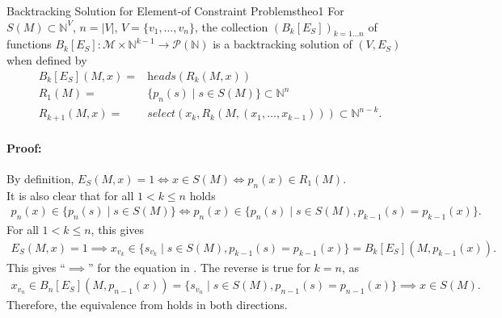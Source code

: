 \begin{theorem}{Backtracking Solution for Element-of Constraint Problems}{theo1}
    For $S(M)\subset\mathbb N^V$, $n=|V|$, $V=\{v_1,\dots,v_n\}$, the collection $(B_k[E_S])_{k=1\dots n}$ of
    functions
    $B_k[E_S]\colon\mathcal M\times\mathbb N^{k-1}\rightarrow\mathcal P(\mathbb N)$
    is a backtracking solution of $(V,E_S)$ when defined by
    \begin{align*}
        B_k[E_S](M,x)={}&\textit{heads}(R_k(M,x))\\
        R_1(M)={}&\{p_n(s)\mid s\in S(M)\}\subset\mathbb N^{n}\\
        R_{k+1}(M,x)={}&\textit{select}(x_k,R_k(M,(x_1,\dots,x_{k-1})))\subset\mathbb N^{n-k}.
    \end{align*}
    \tcblower
    \paragraph*{Proof:} By definition,
    $E_S(M,x)=1\iff x\in S(M)\iff p_n(x)\in R_1(M)$.\\
    It is also clear that for all $1<k\leq n$ holds
    \begin{align*}
        p_n(x)\in\{p_n(s)\mid s\in S(M)\}\iff p_n(x)\in\{p_n(s)\mid s\in S(M),p_{k-1}(s)=p_{k-1}(x)\}.
    \end{align*}
    For all $1<k\leq n$, this gives
    \begin{align*}
        E_S(M,x)=1\implies x_{v_k}\in\{s_{v_k}\mid s\in S(M),p_{k-1}(s)=p_{k-1}(x)\}=B_k[E_S](M,p_{k-1}(x)).
    \end{align*}
    This gives ``$\implies$'' for the equation in .
    The reverse is true for $k=n$, as
    \begin{align*}
        x_{v_n}\in B_n[E_S](M,p_{n-1}(x))=\{s_{v_n}\mid s\in S(M),p_{n-1}(s)=p_{n-1}(x)\}\implies x\in S(M).
    \end{align*}
    Therefore, the equivalence from  holds in both directions.
\end{theorem}
